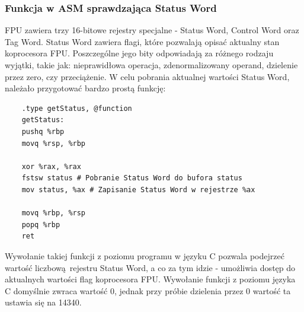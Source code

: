 \documentclass[a4paper,12pt]{article}
\begin{document}
\subsubsection{Funkcja w ASM sprawdzająca Status Word}
FPU zawiera trzy 16-bitowe rejestry specjalne - Status Word, Control Word oraz Tag Word. Status Word zawiera flagi, które pozwalają opisać aktualny stan koprocesora FPU. Poszczególne jego bity odpowiadają za różnego rodzaju wyjątki, takie jak: nieprawidłowa operacja, zdenormalizowany operand, dzielenie przez zero, czy przeciążenie. W celu pobrania aktualnej wartości Status Word, należało przygotować bardzo prostą funkcję:
\begin{verbatim}
	.type getStatus, @function
	getStatus:
	pushq %rbp
	movq %rsp, %rbp
	
	xor %rax, %rax
	fstsw status # Pobranie Status Word do bufora status
	mov status, %ax # Zapisanie Status Word w rejestrze %ax
	
	movq %rbp, %rsp
	popq %rbp
	ret
\end{verbatim}
Wywołanie takiej funkcji z poziomu programu w języku C pozwala podejrzeć wartość liczbową rejestru Status Word, a co za tym idzie - umożliwia dostęp do aktualnych wartości flag koprocesora FPU. Wywołanie funkcji z poziomu języka C domyślnie zwraca wartość 0, jednak przy próbie dzielenia przez 0 wartość ta ustawia się na 14340.
\end{document}
